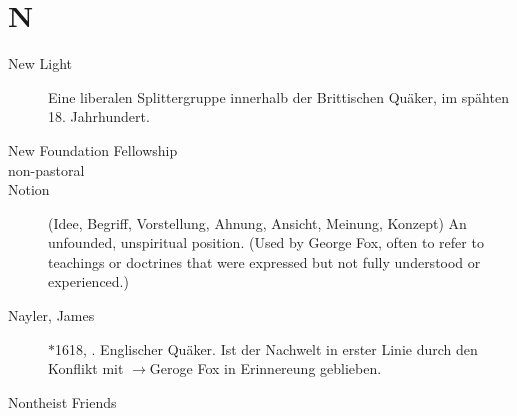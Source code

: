 \section*{N}

\articlesize

\begin{description}

\item[New Light] Eine liberalen Splittergruppe innerhalb der Brittischen Quäker,
im spähten 18. Jahrhundert.


 \item[New Foundation Fellowship]

\item[non-pastoral] 

\item[Notion] (Idee, Begriff, Vorstellung, Ahnung, Ansicht, Meinung, Konzept)
    An unfounded, unspiritual position. (Used by George Fox, often to refer to teachings or doctrines that were expressed but not fully understood or experienced.)

 \item[Nayler, James] $\ast$1618, . Englischer Quäker. Ist der Nachwelt in erster Linie durch den Konflikt mit $\to$Geroge Fox in Erinnereung geblieben.


 \item[Nontheist Friends]

 \end{description}

\normalsize
